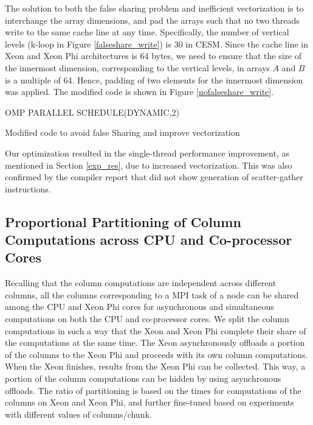 The solution to both the false sharing problem and inefficient vectorization is to interchange the array dimensions, and pad the arrays such that no two threads write to the same cache line at any time. Specifically, the number of vertical levels (k-loop in Figure \ref{falseshare_write}) is 30 in CESM. Since the cache line in Xeon and Xeon Phi architectures is 64 bytes, we need to ensure that the size of the innermost dimension, corresponding to the vertical levels, in arrays $A$ and $B$ is a multiple of 64. Hence, padding of two elements for the innermost dimension was applied. The modified code is shown in Figure \ref{nofalseshare_write}.

\begin{algorithm}
\begin{small}


  OMP PARALLEL SCHEDULE(DYNAMIC,2)
\caption{Modified code to avoid false Sharing and improve vectorization}
\label{nofalseshare_write}
\end{small}
\end{algorithm}

Our optimization resulted in the single-thread performance improvement, as mentioned in Section \ref{exp_res}, due to increased vectorization. This was also confirmed by the compiler report that did not show generation of scatter-gather instructions. 

\subsection{Proportional Partitioning of Column Computations across CPU and Co-processor Cores}

Recalling that the column computations are independent across different columns, all the columns corresponding to a MPI task of a node can be shared among the CPU and Xeon Phi cores for asynchronous and simultaneous computations on both the CPU and co-processor cores. We split the column computations in such a way that the Xeon and Xeon Phi complete their share of the computations at the same time. The Xeon asynchronously offloads a portion of the columns to the Xeon Phi and proceeds with its own column computations. When the Xeon finishes, results from the Xeon Phi can be collected. This way, a portion of the column computations can be hidden by using asynchronous offloads. The ratio of partitioning is based on the times for computations of the columns on Xeon and Xeon Phi, and further fine-tuned based on experiments with different values of columns/chunk.


